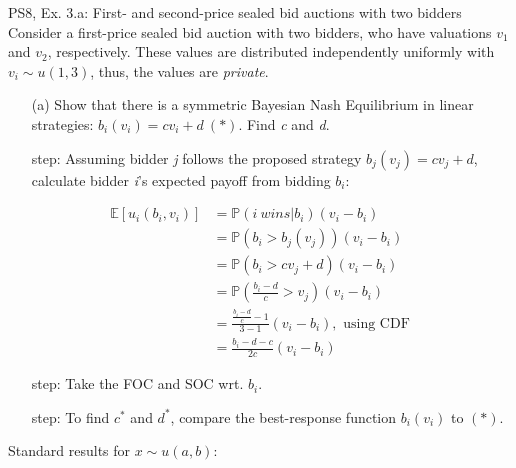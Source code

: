 \begin{frame}{PS8, Ex. 3.a: First- and second-price sealed bid auctions with two bidders}
    Consider a first-price sealed bid auction with two bidders, who have valuations $v_1$ and $v_2$, respectively. These values are distributed independently uniformly with $v_i\sim u(1,3)$, thus, the values are \textit{private}.
    \vspace{-4pt}
    \begin{itemize}
      \item[(a)] Show that there is a symmetric Bayesian Nash Equilibrium in linear strategies: $b_i(v_i) = cv_i + d\ (*)$. Find \textit{c} and \textit{d}.
    \end{itemize}
    \vspace{-8pt}
    \begin{multicols}{2}
      \begin{itemize}
        \item[\nth{1} step:] Assuming bidder \textit{j} follows the proposed strategy $b_j(v_j) = cv_j + d$, calculate bidder \textit{i}'s expected payoff from bidding $b_i$:
      \end{itemize}
      \vspace{-12pt}
      \begin{align*}
        \mathbb{E}[u_i(b_i,v_i)]&=\mathbb{P}(i\ wins|b_i)(v_i-b_i)\\
                                &=\mathbb{P}(b_i>b_j(v_j))(v_i-b_i)\\
                                &=\mathbb{P}(b_i>cv_j+d)(v_i-b_i)\\
                                &=\mathbb{P}\left(\frac{b_i-d}{c}>v_j\right)(v_i-b_i)\\
                                &=\frac{\frac{b_i-d}{c}-1}{3-1}(v_i-b_i),\text{ using CDF}\\
                                &=\frac{b_i-d-c}{2c}(v_i-b_i)
      \end{align*}
      \vspace{-18pt}
      \begin{itemize}
        \item[\nth{2} step:] Take the FOC and SOC wrt. $b_i$.
        \item[\nth{3} step:] To find $c^*$ and $d^*$, compare the best-response function $b_i(v_i)$ to $(*)$.
      \end{itemize}
      \vfill\null\columnbreak
      Standard results for $x\sim u(a, b):$
      \vspace{-6pt}
      \begin{enumerate}

\end{enumerate}
\end{multicols}
\end{frame}
